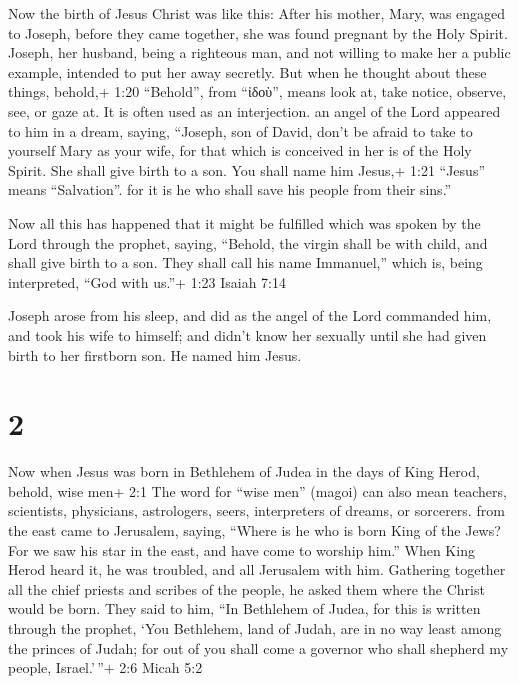  Now the birth of Jesus Christ was like this: After his
mother, Mary, was engaged to Joseph, before they came together, she was
found pregnant by the Holy Spirit.  Joseph, her husband,
being a righteous man, and not willing to make her a public example,
intended to put her away secretly.  But when he thought
about these things, behold,+ 1:20 ``Behold'', from ``ἰδοὺ'', means look
at, take notice, observe, see, or gaze at. It is often used as an
interjection. an angel of the Lord appeared to him in a dream, saying,
``Joseph, son of David, don't be afraid to take to yourself Mary as your
wife, for that which is conceived in her is of the Holy Spirit.
 She shall give birth to a son. You shall name him Jesus,+
1:21 ``Jesus'' means ``Salvation''. for it is he who shall save his
people from their sins.''

 Now all this has happened that it might be fulfilled which
was spoken by the Lord through the prophet, saying, 
``Behold, the virgin shall be with child, and shall give birth to a son.
They shall call his name Immanuel,'' which is, being interpreted, ``God
with us.''+ 1:23 Isaiah 7:14

 Joseph arose from his sleep, and did as the angel of the
Lord commanded him, and took his wife to himself;  and
didn't know her sexually until she had given birth to her firstborn son.
He named him Jesus.

\hypertarget{section-1}{%
\section{2}\label{section-1}}

 Now when Jesus was born in Bethlehem of Judea in the days
of King Herod, behold, wise men+ 2:1 The word for ``wise men'' (magoi)
can also mean teachers, scientists, physicians, astrologers, seers,
interpreters of dreams, or sorcerers. from the east came to Jerusalem,
saying,  ``Where is he who is born King of the Jews? For we
saw his star in the east, and have come to worship him.'' 
When King Herod heard it, he was troubled, and all Jerusalem with him.
 Gathering together all the chief priests and scribes of the
people, he asked them where the Christ would be born.  They
said to him, ``In Bethlehem of Judea, for this is written through the
prophet,  `You Bethlehem, land of Judah, are in no way least
among the princes of Judah; for out of you shall come a governor who
shall shepherd my people, Israel.'\,''+ 2:6 Micah 5:2


